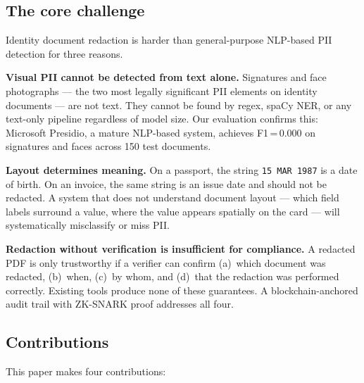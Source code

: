 \documentclass[conference]{IEEEtran}
\begin{document}
\subsection*{The core challenge}

Identity document redaction is harder than general-purpose
NLP-based PII detection for three reasons.

\textbf{Visual PII cannot be detected from text alone.}
Signatures and face photographs --- the two most legally
significant PII elements on identity documents --- are
not text.
They cannot be found by regex, spaCy NER, or any
text-only pipeline regardless of model size.
Our evaluation confirms this: Microsoft Presidio, a
mature NLP-based system, achieves F1\,=\,0.000 on
signatures and faces across 150 test documents.

\textbf{Layout determines meaning.}
On a passport, the string \texttt{15\,MAR\,1987} is a
date of birth.
On an invoice, the same string is an issue date and
should not be redacted.
A system that does not understand document layout ---
which field labels surround a value, where the value
appears spatially on the card --- will systematically
misclassify or miss PII.

\textbf{Redaction without verification is insufficient
for compliance.}
A redacted PDF is only trustworthy if a verifier can
confirm (a)~which document was redacted, (b)~when,
(c)~by whom, and (d)~that the redaction was performed
correctly.
Existing tools produce none of these guarantees.
A blockchain-anchored audit trail with ZK-SNARK proof
addresses all four.

\subsection*{Contributions}

This paper makes four contributions:
\end{document}
